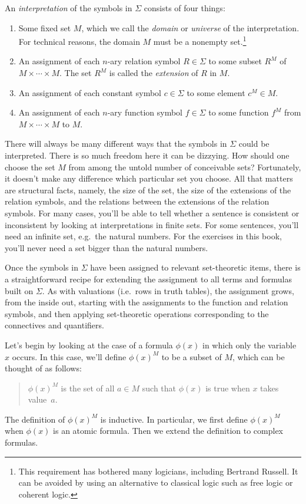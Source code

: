 An \emph{\gls{interpretation}} of the symbols in $\Sigma$ consists of
four things:
\begin{enumerate}
\item Some fixed set $M$, which we call the \emph{domain} or
  \emph{universe} of the interpretation.  For technical reasons, the
  domain $M$ must be a nonempty set.\footnote{This requirement has
    bothered many logicians, including Bertrand Russell.  It can be
    avoided by using an alternative to classical logic such as free
    logic or coherent logic.}
\item An assignment of each $n$-ary relation symbol $R\in\Sigma$ to
  some subset $R^M$ of $M\times\cdots\times M$.  The set $R^M$ is
  called the \emph{extension} of $R$ in $M$.
\item An assignment of each constant symbol $c\in\Sigma$ to some
  element $c^M\in M$.
\item An assignment of each $n$-ary function symbol $f\in\Sigma$ to
  some function $f^M$ from $M\times\cdots\times M$ to $M$.
\end{enumerate}
There will always be many different ways that the symbols in $\Sigma$
could be interpreted.  There is so much freedom here it can be
dizzying.  How should one choose the set $M$ from among the untold
number of conceivable sets?  Fortunately, it doesn't make any
difference which particular set you choose.  All that matters are
structural facts, namely, the size of the set, the size of the
extensions of the relation symbols, and the relations between the
extensions of the relation symbols.  For many cases, you'll be able to
tell whether a sentence is consistent or inconsistent by looking at
interpretations in finite sets.  For some sentences, you'll need an
infinite set, e.g.\ the natural numbers.  For the exercises in this
book, you'll never need a set bigger than the natural numbers.

Once the symbols in $\Sigma$ have been assigned to relevant
set-theoretic items, there is a straightforward recipe for extending
the assignment to all terms and formulas built on $\Sigma$.  As with
valuations (i.e.\ rows in truth tables), the assignment grows, from
the inside out, starting with the assignments to the function and
relation symbols, and then applying set-theoretic operations
corresponding to the connectives and quantifiers.

Let's begin by looking at the case of a formula $\phi (x)$ in which
only the variable $x$ occurs.  In this case, we'll define
$\phi (x) ^M$ to be a subset of $M$, which can be thought of as
follows:
\begin{quote} $\phi (x)^M$ is the set of all $a\in M$ such that
  $\phi (x)$ is true when $x$ takes value~$a$.  \end{quote} The
definition of $\phi (x)^M$ is inductive.  In particular, we first
define $\phi (x)^M$ when $\phi (x)$ is an atomic formula.  Then we
extend the definition to complex formulas.  

